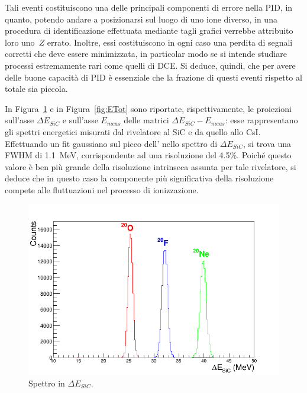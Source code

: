 Tali eventi costituiscono una delle principali componenti di errore nella PID, in quanto, potendo andare a posizionarsi sul luogo di uno ione diverso, in una procedura di identificazione effettuata mediante tagli grafici verrebbe attribuito loro uno~$Z$ errato.
Inoltre, essi costituiscono in ogni caso una perdita di segnali corretti che deve essere minimizzata, in particolar modo se si intende studiare processi estremamente rari come quelli di DCE.
Si deduce, quindi, che per avere delle buone capacità di PID è essenziale che la frazione di questi eventi rispetto al totale sia piccola.











In Figura~\ref{fig:deltaE_Tot} e in Figura~\ref{fig:ETot} sono riportate, rispettivamente, le proiezioni sull'asse $\Delta E_{SiC}$ e sull'asse $E_{meas}$ delle matrici $\Delta E_{SiC} - E_{meas}$: esse rappresentano gli spettri energetici misurati dal rivelatore al SiC e da quello allo CsI.
Effettuando un fit gaussiano sul picco dell' nello spettro di $\Delta E_{SiC}$, si trova una FWHM di 1.1~MeV, corrispondente ad una risoluzione del 4.5\%.
Poiché questo valore è ben più grande della risoluzione intrinseca assunta per tale rivelatore, si deduce che in questo caso la componente più significativa della risoluzione compete alle fluttuazioni nel processo di ionizzazione.

\begin{figure} [!p]
	\centering
	\includegraphics[scale=0.5]{Grafici_Tesi2/Particelle_monocromatiche/deltaE.png}
	\caption{Spettro in $ \Delta E_{SiC} $.} \label{fig:deltaE_Tot}
\end{figure}


